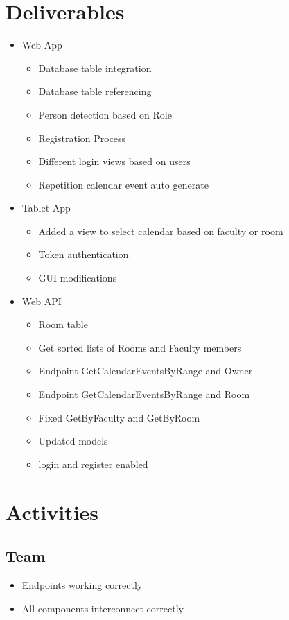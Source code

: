 \documentclass{article}
\begin{document}
{\section*{Deliverables}
\begin{itemize}
\item Web App
\begin{itemize}
\item Database table integration
\item Database table referencing
\item Person detection based on Role
\item Registration Process
\item Different login views based on users
\item Repetition calendar event auto generate
\end{itemize}
\item Tablet App
\begin{itemize}
\item Added a view to select calendar based on faculty or room
\item Token authentication
\item GUI modifications
\end{itemize}
\item Web API
\begin{itemize}
\item Room table
\item Get sorted lists of Rooms and Faculty members
\item Endpoint GetCalendarEventsByRange and Owner
\item Endpoint GetCalendarEventsByRange and Room
\item Fixed GetByFaculty and GetByRoom
\item Updated models
\item login and register enabled
\end{itemize}
\end{itemize}

\section*{Activities}
\subsection*{Team}
\begin{itemize}
\item Endpoints working correctly
\item All components interconnect correctly
\end{itemize}

}
\end{document}
